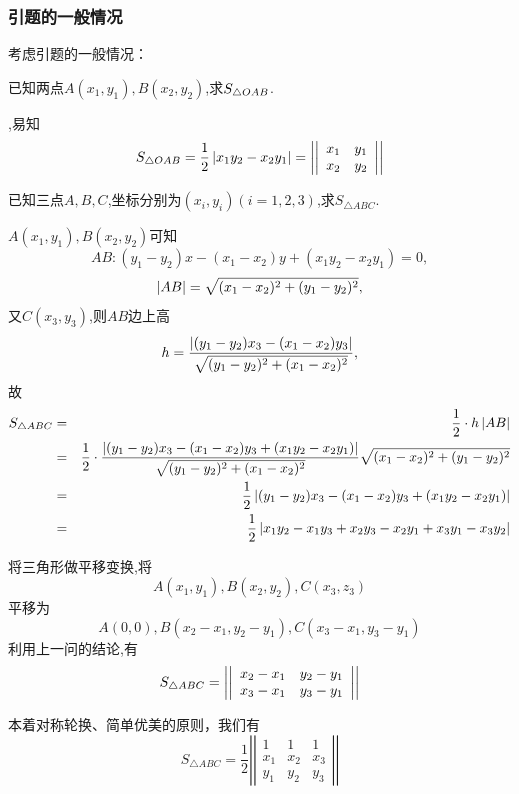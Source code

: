 \subsubsection{引题的一般情况}
考虑引题的一般情况：

\prob 已知两点$A(x_1,y_1),B(x_2,y_2)$,求$\displaystyle S_{\triangle OAB}$.

,易知
$$
S_{\triangle OAB}=\frac{1}{2}\left| {x_1y_2-x_2y_1} \right|
=\left| {\left| {\begin{array}{cc}
  x_1&y_1\\
  x_2&y_2\\ 
\end{array}} \right|} \right|
$$
\solend

\prob 已知三点$A,B,C$,坐标分别为$(x_i,y_i)(i=1,2,3)$,求$S_{\triangle ABC}$.

$A(x_1,y_1),B(x_2,y_2)$可知
$$AB:(y_1-y_2)x-(x_1-x_2)y+(x_1y_2-x_2y_1)=0,$$
$$\left| {AB} \right|=\sqrt{(x_1-x_2)^2+(y_1-y_2)^2},$$
又$C(x_3,y_3)$,则$AB$边上高
$$h=\frac{\left| {(y_1-y_2)x_3-(x_1-x_2)y_3} \right|}
{\sqrt{(y_1-y_2)^2+(x_1-x_2)^2}},$$
故
\begin{eqnarray}
  S_{\triangle ABC}&=&\frac{1}{2}\cdot h \left| {AB} \right|\nonumber\\
  &=&\frac{1}{2}\cdot \frac{\left| {(y_1-y_2)x_3-(x_1-x_2)y_3+(x_1y_2-x_2y_1)} \right|}
    {\sqrt{(y_1-y_2)^2+(x_1-x_2)^2}}
    \sqrt{(x_1-x_2)^2+(y_1-y_2)^2}\nonumber\\
  &=&\frac{1}{2}\left| {(y_1-y_2)x_3-(x_1-x_2)y_3+(x_1y_2-x_2y_1)} \right|\nonumber\\
  &=&\frac{1}{2}\left| {x_1y_2-x_1y_3+x_2y_3-x_2y_1+x_3y_1-x_3y_2} \right|\nonumber
\end{eqnarray}
\solend

\sol 将三角形做平移变换,将
$$ A(x_1,y_1),B(x_2,y_2),C(x_3,z_3)$$
平移为
$$A(0,0),B(x_2-x_1,y_2-y_1),C(x_3-x_1,y_3-y_1)$$
利用上一问的结论,有
$$S_{\triangle ABC}=
\left| {\left| {\begin{array}{cc}
  x_2-x_1&y_2-y_1\\
  x_3-x_1&y_3-y_1\\ 
\end{array}} \right|} \right|
$$
\solend

本着对称轮换、简单优美的原则，我们有$$S_{\triangle ABC}=
\frac{1}{2}\left|\left|\begin{array}{ccc}
    1 & 1 & 1 \\
    x_1 & x_2 & x_3 \\  
    y_1 & y_2 & y_3 
  \end{array}\right|\right|
$$

